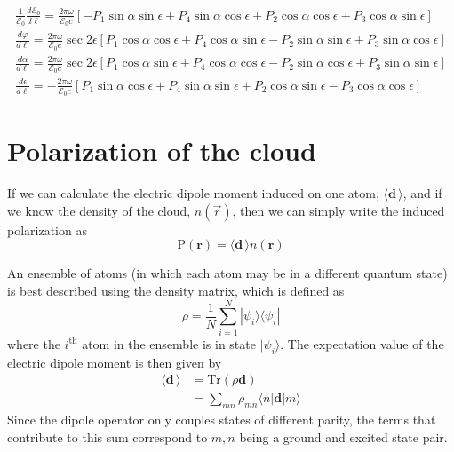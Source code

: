\documentclass[11pt,letter]{article}
\newcommand{\bv}[1]{\ensuremath{\bm{#1}}}
\newcommand{\efieldo}{\ensuremath{\mathcal{E}_{0}}}
\newcommand{\dpol}{\ensuremath{\bv{\mathrm{P}}}}
\begin{document}
\begin{align} 
 \frac{1}{\efieldo} \frac{d \efieldo }{ d \ell} =  
     \frac{2\pi \omega}{\efieldo c} [  
          - P_{1} \sin\alpha\sin\epsilon 
          + P_{4} \sin\alpha\cos\epsilon
          + P_{2} \cos\alpha\cos\epsilon 
          + P_{3} \cos\alpha\sin\epsilon ] \\
 \frac{ d \varphi }{d \ell} = 
     \frac{2\pi\omega}{\efieldo c} \sec 2 \epsilon[ 
            P_{1} \cos\alpha\cos\epsilon 
          + P_{4} \cos\alpha\sin\epsilon
          - P_{2}\sin\alpha\sin\epsilon 
          + P_{3}\sin\alpha\cos\epsilon ] \\
 \frac{ d \alpha}{ d \ell} = 
     \frac{2\pi\omega}{\efieldo c} \sec 2 \epsilon[
            P_{1} \cos\alpha\sin\epsilon 
          + P_{4} \cos\alpha\cos\epsilon
          - P_{2} \sin\alpha\cos\epsilon 
          + P_{3} \sin\alpha\sin\epsilon ] \\
 \frac{ d \epsilon}{ d \ell} = 
     - \frac{2\pi\omega}{\efieldo c }[ 
            P_{1} \sin\alpha\cos\epsilon 
          + P_{4} \sin\alpha\sin\epsilon
          + P_{2} \cos\alpha\sin\epsilon 
          - P_{3} \cos\alpha\cos\epsilon  ] 
 \label{eq:diff-param} 
\end{align}
 
     
    
\section{Polarization of the cloud}  


If we can calculate the electric
dipole moment induced on one atom, $\langle \bv{d}\, \rangle$, and if we know
the density of the cloud, $n(\vec{r})$, then we can simply write the induced
polarization as 
\begin{equation}
 \dpol(\bv{r}) = \langle \bv{d}\, \rangle n(\bv{r}) 
\end{equation}

An ensemble of atoms (in which each atom may be in a different quantum state) is
best described using the density matrix, which is defined as \begin{equation}
  \rho = \frac{1}{N} \sum_{i=1}^{N} | \psi_{i} \rangle \langle \psi_{i} | 
\end{equation}
where the $i^{\text{th}}$ atom in the ensemble is in state $|\psi_{i}\rangle$.
The expectation value of the electric dipole moment is then given by 
\begin{equation}
\begin{split}
   \langle \bv{d}\, \rangle  & = \text{Tr} ( \rho \bv{d} )  \\
   & = \sum_{mn} \rho_{mn} \langle n | \bv{d} | m \rangle
\end{split} 
\end{equation} 
Since the dipole operator only couples states of different parity, the terms
that contribute to this sum correspond to $m,n$ being a ground and excited
state pair.   
\end{document}
